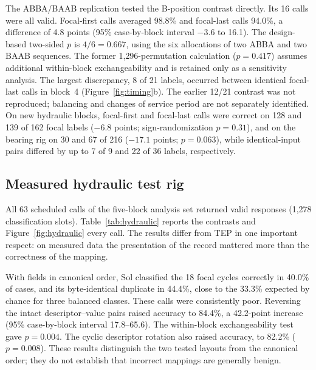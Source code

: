 \documentclass[11pt,a4paper]{article}
\begin{document}
The ABBA/BAAB replication tested the B-position contrast directly. Its 16 calls were all valid. Focal-first calls averaged 98.8\% and focal-last calls 94.0\%, a difference of 4.8 points (95\% case-by-block interval $-3.6$ to 16.1). The design-based two-sided $p$ is $4/6=0.667$, using the six allocations of two ABBA and two BAAB sequences. The former 1{,}296-permutation calculation ($p=0.417$) assumes additional within-block exchangeability and is retained only as a sensitivity analysis. The largest discrepancy, 8 of 21 labels, occurred between identical focal-last calls in block~4 (Figure~\ref{fig:timing}b). The earlier 12/21 contrast was not reproduced; balancing and changes of service period are not separately identified. On new hydraulic blocks, focal-first and focal-last calls were correct on 128 and 139 of 162 focal labels ($-6.8$ points; sign-randomization $p=0.31$), and on the bearing rig on 30 and 67 of 216 ($-17.1$ points; $p=0.063$), while identical-input pairs differed by up to 7 of 9 and 22 of 36 labels, respectively.

\subsection{Measured hydraulic test rig}
All 63 scheduled calls of the five-block analysis set returned valid responses (1{,}278 classification slots). Table~\ref{tab:hydraulic} reports the contrasts and Figure~\ref{fig:hydraulic} every call. The results differ from TEP in one important respect: on measured data the presentation of the record mattered more than the correctness of the mapping.

With fields in canonical order, Sol classified the 18 focal cycles correctly in 40.0\% of cases, and its byte-identical duplicate in 44.4\%, close to the 33.3\% expected by chance for three balanced classes. These calls were consistently poor. Reversing the intact descriptor--value pairs raised accuracy to 84.4\%, a 42.2-point increase (95\% case-by-block interval 17.8--65.6). The within-block exchangeability test gave $p=0.004$. The cyclic descriptor rotation also raised accuracy, to 82.2\% ($p=0.008$). These results distinguish the two tested layouts from the canonical order; they do not establish that incorrect mappings are generally benign.
\end{document}
